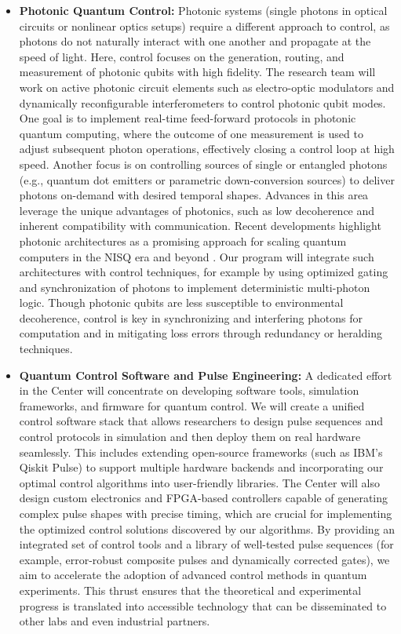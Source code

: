 \documentclass[11pt]{article}
\begin{document}
\begin{itemize}
   \item \textbf{Photonic Quantum Control:} Photonic systems (single photons in optical circuits or nonlinear optics setups) require a different approach to control, as photons do not naturally interact with one another and propagate at the speed of light. Here, control focuses on the generation, routing, and measurement of photonic qubits with high fidelity. The research team will work on active photonic circuit elements such as electro-optic modulators and dynamically reconfigurable interferometers to control photonic qubit modes. One goal is to implement real-time feed-forward protocols in photonic quantum computing, where the outcome of one measurement is used to adjust subsequent photon operations, effectively closing a control loop at high speed. Another focus is on controlling sources of single or entangled photons (e.g., quantum dot emitters or parametric down-conversion sources) to deliver photons on-demand with desired temporal shapes. Advances in this area leverage the unique advantages of photonics, such as low decoherence and inherent compatibility with communication. Recent developments highlight photonic architectures as a promising approach for scaling quantum computers in the NISQ era and beyond \cite{AbuGhanem24}. Our program will integrate such architectures with control techniques, for example by using optimized gating and synchronization of photons to implement deterministic multi-photon logic. Though photonic qubits are less susceptible to environmental decoherence, control is key in synchronizing and interfering photons for computation and in mitigating loss errors through redundancy or heralding techniques.
   \item \textbf{Quantum Control Software and Pulse Engineering:} A dedicated effort in the Center will concentrate on developing software tools, simulation frameworks, and firmware for quantum control. We will create a unified control software stack that allows researchers to design pulse sequences and control protocols in simulation and then deploy them on real hardware seamlessly. This includes extending open-source frameworks (such as IBM's Qiskit Pulse) to support multiple hardware backends and incorporating our optimal control algorithms into user-friendly libraries. The Center will also design custom electronics and FPGA-based controllers capable of generating complex pulse shapes with precise timing, which are crucial for implementing the optimized control solutions discovered by our algorithms. By providing an integrated set of control tools and a library of well-tested pulse sequences (for example, error-robust composite pulses and dynamically corrected gates), we aim to accelerate the adoption of advanced control methods in quantum experiments. This thrust ensures that the theoretical and experimental progress is translated into accessible technology that can be disseminated to other labs and even industrial partners.

\end{itemize}
\end{document}
